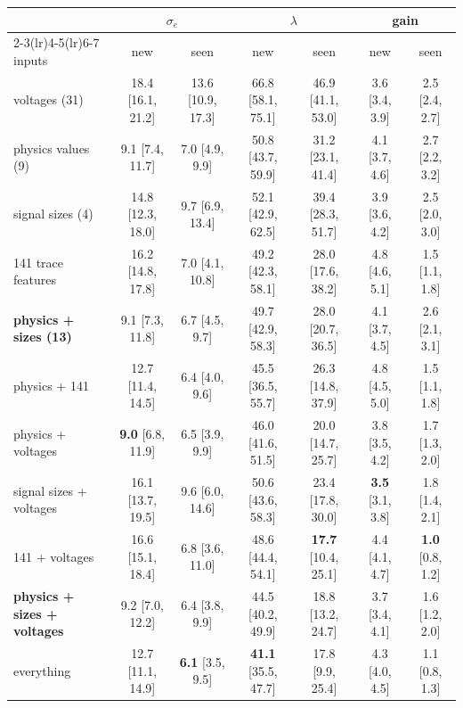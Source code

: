 \documentclass[10pt,a4paper]{article}
\begin{document}
\begin{center}\footnotesize
\setlength{\tabcolsep}{3pt}
\begin{tabular}{@{}lcccccc@{}}\toprule
 & \multicolumn{2}{c}{$\sigma_e$} & \multicolumn{2}{c}{$\lambda$} & \multicolumn{2}{c}{gain}\\
\cmidrule(lr){2-3}\cmidrule(lr){4-5}\cmidrule(lr){6-7}
inputs & new & seen & new & seen & new & seen\\\midrule
voltages (31) & 18.4 {\scriptsize[16.1, 21.2]} & 13.6 {\scriptsize[10.9, 17.3]} & 66.8 {\scriptsize[58.1, 75.1]} & 46.9 {\scriptsize[41.1, 53.0]} & 3.6 {\scriptsize[3.4, 3.9]} & 2.5 {\scriptsize[2.4, 2.7]}\\
physics values (9) & 9.1 {\scriptsize[7.4, 11.7]} & 7.0 {\scriptsize[4.9, 9.9]} & 50.8 {\scriptsize[43.7, 59.9]} & 31.2 {\scriptsize[23.1, 41.4]} & 4.1 {\scriptsize[3.7, 4.6]} & 2.7 {\scriptsize[2.2, 3.2]}\\
signal sizes (4) & 14.8 {\scriptsize[12.3, 18.0]} & 9.7 {\scriptsize[6.9, 13.4]} & 52.1 {\scriptsize[42.9, 62.5]} & 39.4 {\scriptsize[28.3, 51.7]} & 3.9 {\scriptsize[3.6, 4.2]} & 2.5 {\scriptsize[2.0, 3.0]}\\
141 trace features & 16.2 {\scriptsize[14.8, 17.8]} & 7.0 {\scriptsize[4.1, 10.8]} & 49.2 {\scriptsize[42.3, 58.1]} & 28.0 {\scriptsize[17.6, 38.2]} & 4.8 {\scriptsize[4.6, 5.1]} & 1.5 {\scriptsize[1.1, 1.8]}\\
\textbf{physics + sizes (13)} & 9.1 {\scriptsize[7.3, 11.8]} & 6.7 {\scriptsize[4.5, 9.7]} & 49.7 {\scriptsize[42.9, 58.3]} & 28.0 {\scriptsize[20.7, 36.5]} & 4.1 {\scriptsize[3.7, 4.5]} & 2.6 {\scriptsize[2.1, 3.1]}\\
physics + 141 & 12.7 {\scriptsize[11.4, 14.5]} & 6.4 {\scriptsize[4.0, 9.6]} & 45.5 {\scriptsize[36.5, 55.7]} & 26.3 {\scriptsize[14.8, 37.9]} & 4.8 {\scriptsize[4.5, 5.0]} & 1.5 {\scriptsize[1.1, 1.8]}\\
physics + voltages & \textbf{9.0} {\scriptsize[6.8, 11.9]} & 6.5 {\scriptsize[3.9, 9.9]} & 46.0 {\scriptsize[41.6, 51.5]} & 20.0 {\scriptsize[14.7, 25.7]} & 3.8 {\scriptsize[3.5, 4.2]} & 1.7 {\scriptsize[1.3, 2.0]}\\
signal sizes + voltages & 16.1 {\scriptsize[13.7, 19.5]} & 9.6 {\scriptsize[6.0, 14.6]} & 50.6 {\scriptsize[43.6, 58.3]} & 23.4 {\scriptsize[17.8, 30.0]} & \textbf{3.5} {\scriptsize[3.1, 3.8]} & 1.8 {\scriptsize[1.4, 2.1]}\\
141 + voltages & 16.6 {\scriptsize[15.1, 18.4]} & 6.8 {\scriptsize[3.6, 11.0]} & 48.6 {\scriptsize[44.4, 54.1]} & \textbf{17.7} {\scriptsize[10.4, 25.1]} & 4.4 {\scriptsize[4.1, 4.7]} & \textbf{1.0} {\scriptsize[0.8, 1.2]}\\
\textbf{physics + sizes + voltages} & 9.2 {\scriptsize[7.0, 12.2]} & 6.4 {\scriptsize[3.8, 9.9]} & 44.5 {\scriptsize[40.2, 49.9]} & 18.8 {\scriptsize[13.2, 24.7]} & 3.7 {\scriptsize[3.4, 4.1]} & 1.6 {\scriptsize[1.2, 2.0]}\\
everything & 12.7 {\scriptsize[11.1, 14.9]} & \textbf{6.1} {\scriptsize[3.5, 9.5]} & \textbf{41.1} {\scriptsize[35.5, 47.7]} & 17.8 {\scriptsize[9.9, 25.4]} & 4.3 {\scriptsize[4.0, 4.5]} & 1.1 {\scriptsize[0.8, 1.3]}\\
\bottomrule
\end{tabular}
\end{center}
\end{document}
